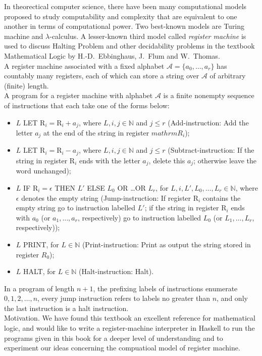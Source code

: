\documentclass{report}
\begin{document}
In theorectical computer science, there have been many computational models proposed to study computability and complexity that are equivalent to one another in terms of computational power. Two best-known models are Turing machine and $\lambda$-calculus. A lesser-known third model called \emph{register machine} is used to discuss Halting Problem and other decidability problems in the textbook Mathematical Logic by H.-D.\ Ebbinghaus, J.\ Flum and W.\ Thomas.
\medskip\\
A register machine associated with a fixed alphabet $\mathcal{A} = \{a_0, \ldots, a_r\}$ has countably many registers, each of which can store a string over $\mathcal{A}$ of arbitrary (finite) length.
\medskip\\
A program for a register machine with alphabet $\mathcal{A}$ is a finite nonempty sequence of instructions that each take one of the forms below:
\begin{itemize}
\item $L$ LET $\mathrm{R}_i = \mathrm{R}_i + a_j$, where $L, i, j \in \mathbb{N}$ and $j \leq r$ (Add-instruction: Add the letter $a_j$ at the end of the string in register $mathrm{R}_i$);
\item $L$ LET $\mathrm{R}_i = \mathrm{R}_i - a_j$, where $L, i, j \in \mathbb{N}$ and $j \leq r$ (Subtract-instruction: If the string in register $\mathrm{R}_i$ ends with the letter $a_j$, delete this $a_j$; otherwise leave the word unchanged);
\item $L$ IF $\mathrm{R}_i = \epsilon$ THEN $L'$ ELSE $L_0$ OR \ldots OR $L_r$, for $L, i, L', L_0, \ldots , L_r \in \mathbb{N}$, where $\epsilon$ denotes the empty string (Jump-instruction: If register $\mathrm{R}_i$ contains the empty string go to instruction labelled $L'$; if the string in register $\mathrm{R}_i$ ends with $a_0$ (or $a_1, \ldots, a_r$, respectively) go to instruction labelled $L_0$ (or $L_1, \ldots, L_r$, respectively));
\item $L$ PRINT, for $L \in \mathbb{N}$ (Print-instruction: Print as output the string stored in register
$R_0$);
\item $L$ HALT, for $L \in \mathbb{N}$ (Halt-instruction: Halt).
\end{itemize}
In a program of length $n + 1$, the prefixing labels of instructions enumerate $0, 1, 2, \ldots, n$, every jump instruction refers to labels no greater than $n$, and only the last instruction is a halt instruction.
\medskip\\
Motivation. We have found this textbook an excellent reference for mathematical logic, and would like to write a register-machine interpreter in Haskell to run the programs given in this book for a deeper level of understanding and to experiment our ideas concerning the compuatioal model of register machine.
\end{document}
